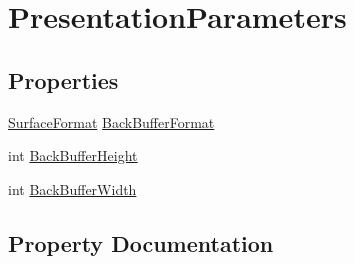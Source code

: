 \hypertarget{classMicrosoft_1_1Xna_1_1Framework_1_1Graphics_1_1PresentationParameters}{}\section{Presentation\+Parameters}
\label{classMicrosoft_1_1Xna_1_1Framework_1_1Graphics_1_1PresentationParameters}
\subsection*{Properties}
\begin{DoxyCompactItemize}
\item 
\hyperlink{namespaceMicrosoft_1_1Xna_1_1Framework_1_1Graphics_a2c30f3edaf443866b3c9b240306fdcc9}{Surface\+Format} \hyperlink{classMicrosoft_1_1Xna_1_1Framework_1_1Graphics_1_1PresentationParameters_af6648715472a12718a0a14d2dd341afc}{Back\+Buffer\+Format}
\item 
int \hyperlink{classMicrosoft_1_1Xna_1_1Framework_1_1Graphics_1_1PresentationParameters_a67ec49a7a6b6f849277857aa515a2b23}{Back\+Buffer\+Height}
\item 
int \hyperlink{classMicrosoft_1_1Xna_1_1Framework_1_1Graphics_1_1PresentationParameters_aedf9ad4b2680dd9d64d419b54c869434}{Back\+Buffer\+Width}
\end{DoxyCompactItemize}


\subsection{Property Documentation}
\hypertarget{classMicrosoft_1_1Xna_1_1Framework_1_1Graphics_1_1PresentationParameters_af6648715472a12718a0a14d2dd341afc}{}
